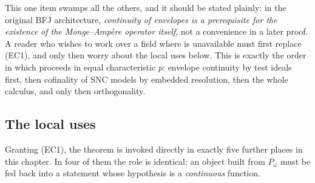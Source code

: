 This one item swamps all the others, and it should be stated plainly: in the
original BFJ architecture, \emph{continuity of envelopes is a prerequisite
for the existence of the Monge--Amp\`ere operator itself}, not a convenience
in a later proof.  A reader who wishes to work over a field where
 is unavailable must first replace
\textup{(EC1)}, and only then worry about the local uses below.  This is
exactly the order in which
 proceeds in equal characteristic
\(p\): envelope continuity by test ideals first, then cofinality of SNC
models by embedded resolution, then the whole calculus, and only then
orthogonality.

\subsection{The local uses}
\label{sec:ch27-local-uses}

Granting \textup{(EC1)}, the theorem is invoked directly in exactly five
further places in this chapter.  In four of them the role is identical: an
object built from \(P_\omega\) must be fed back into a statement whose
hypothesis is a \emph{continuous} function.

